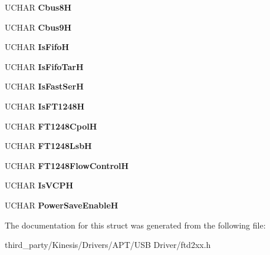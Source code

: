 \begin{DoxyCompactItemize}
\item 
U\+C\+H\+AR {\bfseries Cbus8H}\hypertarget{structft__program__data_aafd97398ad5b8ac453ded17e2b777938}{}\label{structft__program__data_aafd97398ad5b8ac453ded17e2b777938}

\item 
U\+C\+H\+AR {\bfseries Cbus9H}\hypertarget{structft__program__data_a707c521299114d1d4903d6286b6b07e8}{}\label{structft__program__data_a707c521299114d1d4903d6286b6b07e8}

\item 
U\+C\+H\+AR {\bfseries Is\+FifoH}\hypertarget{structft__program__data_a38ce59e2b1723db2d14addfceecabecb}{}\label{structft__program__data_a38ce59e2b1723db2d14addfceecabecb}

\item 
U\+C\+H\+AR {\bfseries Is\+Fifo\+TarH}\hypertarget{structft__program__data_ab9cf4df075da21102def2162c3d281d1}{}\label{structft__program__data_ab9cf4df075da21102def2162c3d281d1}

\item 
U\+C\+H\+AR {\bfseries Is\+Fast\+SerH}\hypertarget{structft__program__data_a445221508c1c077d30621dfe20316f59}{}\label{structft__program__data_a445221508c1c077d30621dfe20316f59}

\item 
U\+C\+H\+AR {\bfseries Is\+F\+T1248H}\hypertarget{structft__program__data_a449c65a49b91d6c34045632b662834ab}{}\label{structft__program__data_a449c65a49b91d6c34045632b662834ab}

\item 
U\+C\+H\+AR {\bfseries F\+T1248\+CpolH}\hypertarget{structft__program__data_a60a9e8a5d36a0e3afcb3236f82a99b1d}{}\label{structft__program__data_a60a9e8a5d36a0e3afcb3236f82a99b1d}

\item 
U\+C\+H\+AR {\bfseries F\+T1248\+LsbH}\hypertarget{structft__program__data_a4088d357bd88bee7c601fa525a9175ea}{}\label{structft__program__data_a4088d357bd88bee7c601fa525a9175ea}

\item 
U\+C\+H\+AR {\bfseries F\+T1248\+Flow\+ControlH}\hypertarget{structft__program__data_accb9f60cb1450ffd7d942e95729188ed}{}\label{structft__program__data_accb9f60cb1450ffd7d942e95729188ed}

\item 
U\+C\+H\+AR {\bfseries Is\+V\+C\+PH}\hypertarget{structft__program__data_aa92920576a9253a1ea656bb9979bdace}{}\label{structft__program__data_aa92920576a9253a1ea656bb9979bdace}

\item 
U\+C\+H\+AR {\bfseries Power\+Save\+EnableH}\hypertarget{structft__program__data_a52194d4e0e5d8f880186dcdb507d966a}{}\label{structft__program__data_a52194d4e0e5d8f880186dcdb507d966a}

\end{DoxyCompactItemize}


The documentation for this struct was generated from the following file\+:\begin{DoxyCompactItemize}
\item 
third\+\_\+party/\+Kinesis/\+Drivers/\+A\+P\+T/\+U\+S\+B Driver/ftd2xx.\+h\end{DoxyCompactItemize}
